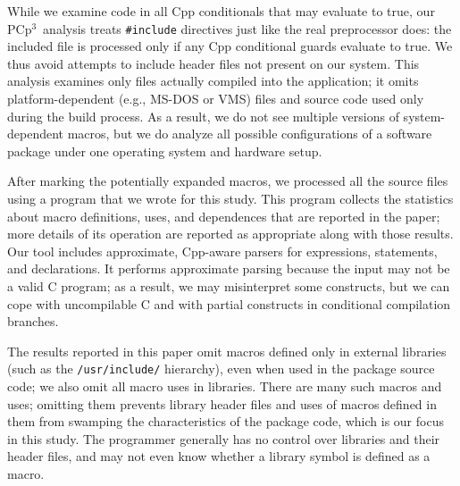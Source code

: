 \documentclass[10pt]{article}
\newcommand{\pcp}{\mbox{\textsf{PCp}$^3$}}
\newcommand{\file}[1]{\texttt{#1}}
\begin{document}
While we examine code in all Cpp conditionals that may evaluate to true,
our \pcp\ analysis treats {\tt \#include} directives just like the real
preprocessor does:  the included file is processed only if any Cpp
conditional guards evaluate to true.  We thus avoid attempts to include
header files not present on our system.  This analysis examines only files
actually compiled into the application; it omits platform-dependent
(e.g., MS-DOS or VMS) files and source code used only during the build
process.  As a result, we do not see multiple versions of system-dependent
macros, but we do analyze all possible configurations of a software package
under one operating system and hardware setup.







After marking the potentially expanded macros, we processed all the source
files using a program that we wrote for this study.  This program collects the
statistics about macro definitions, uses, and dependences that are
reported in the paper; more details of its operation are reported as
appropriate along with those results.  Our tool includes approximate,
Cpp-aware parsers for
expressions, statements, and declarations.  It performs approximate parsing
because the input may not be a valid C program; as a result, we may
misinterpret some constructs, but we can cope with uncompilable C and with
partial constructs in conditional compilation branches.

The results reported in this paper omit macros defined only in external
libraries (such as the \file{/usr/include/} hierarchy), even when used in
the package source code; we also omit all macro uses in libraries.  
There are many such macros and uses; omitting them
prevents library header files and uses of macros defined in them from
swamping the characteristics of the
package code, which is our focus in this study.  The programmer generally
has no control over libraries and their header files, and may not even know
whether a library symbol is defined as a macro.
\end{document}
